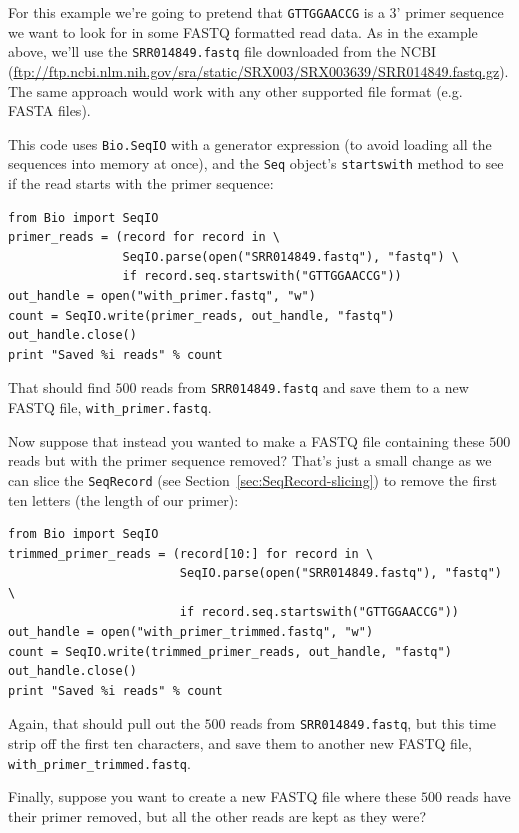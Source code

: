 \documentclass{report}
\begin{document}
For this example we're going to pretend that \texttt{GTTGGAACCG} is a 3' primer
sequence we want to look for in some FASTQ formatted read data.  As in the example
above, we'll use the \texttt{SRR014849.fastq} file downloaded from the NCBI
(\url{ftp://ftp.ncbi.nlm.nih.gov/sra/static/SRX003/SRX003639/SRR014849.fastq.gz}).
The same approach would work with any other supported file format (e.g. FASTA files).

This code uses \verb|Bio.SeqIO| with a generator expression (to avoid loading
all the sequences into memory at once), and the \verb|Seq| object's
\verb|startswith| method to see if the read starts with the primer sequence:

\begin{verbatim}
from Bio import SeqIO
primer_reads = (record for record in \
                SeqIO.parse(open("SRR014849.fastq"), "fastq") \
                if record.seq.startswith("GTTGGAACCG"))
out_handle = open("with_primer.fastq", "w")
count = SeqIO.write(primer_reads, out_handle, "fastq")
out_handle.close()
print "Saved %i reads" % count
\end{verbatim}

\noindent That should find $500$ reads from \texttt{SRR014849.fastq} and save them to
a new FASTQ file, \texttt{with\_primer.fastq}.

Now suppose that instead you wanted to make a FASTQ file containing these $500$ reads
but with the primer sequence removed?  That's just a small change as we can slice the
\verb|SeqRecord| (see Section~\ref{sec:SeqRecord-slicing}) to remove the first ten
letters (the length of our primer):

\begin{verbatim}
from Bio import SeqIO
trimmed_primer_reads = (record[10:] for record in \
                        SeqIO.parse(open("SRR014849.fastq"), "fastq") \
                        if record.seq.startswith("GTTGGAACCG"))
out_handle = open("with_primer_trimmed.fastq", "w")
count = SeqIO.write(trimmed_primer_reads, out_handle, "fastq")
out_handle.close()
print "Saved %i reads" % count
\end{verbatim}

\noindent Again, that should pull out the $500$ reads from \texttt{SRR014849.fastq},
but this time strip off the first ten characters, and save them to another new
FASTQ file, \texttt{with\_primer\_trimmed.fastq}.

Finally, suppose you want to create a new FASTQ file where these $500$ reads have
their primer removed, but all the other reads are kept as they were?
\end{document}

